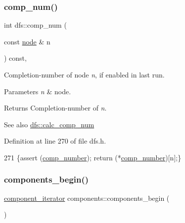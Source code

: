 \subsubsection{\texorpdfstring{comp\+\_\+num()}{comp\_num()}}
{\footnotesize\ttfamily int dfs\+::comp\+\_\+num (\begin{DoxyParamCaption}\item[{const \mbox{\hyperlink{classnode}{node}} \&}]{n }\end{DoxyParamCaption}) const\hspace{0.3cm}{\ttfamily [inline]}, {\ttfamily [inherited]}}



Completion-\/number of node {\itshape n}, if enabled in last run. 


\begin{DoxyParams}{Parameters}
{\em n} & node. \\
\hline
\end{DoxyParams}
\begin{DoxyReturn}{Returns}
Completion-\/number of {\itshape n}. 
\end{DoxyReturn}
\begin{DoxySeeAlso}{See also}
\mbox{\hyperlink{classdfs_a70862ea715c52eb95fb704afd3a6e676}{dfs\+::calc\+\_\+comp\+\_\+num}} 
\end{DoxySeeAlso}


Definition at line 270 of file dfs.\+h.


\begin{DoxyCode}
271     \{assert (\mbox{\hyperlink{classdfs_a00db016ac7eab69045cae408008890c1}{comp\_number}}); \textcolor{keywordflow}{return} (*\mbox{\hyperlink{classdfs_a00db016ac7eab69045cae408008890c1}{comp\_number}})[n];\}
\end{DoxyCode}
\mbox{\label{classcomponents_a8a645639044375cdaefabffda3ae70e0}} 
\subsubsection{\texorpdfstring{components\+\_\+begin()}{components\_begin()}}
{\footnotesize\ttfamily \mbox{\hyperlink{classcomponents_a0954ef13f83f3c1ac6cd4474cac17a36}{component\+\_\+iterator}} components\+::components\+\_\+begin (\begin{DoxyParamCaption}{ }\end{DoxyParamCaption})\hspace{0.3cm}{\ttfamily [inline]}}



